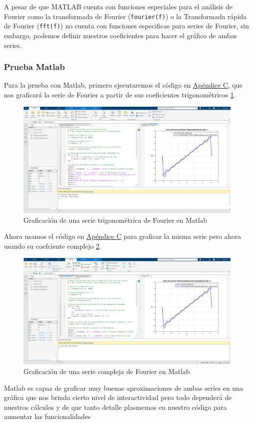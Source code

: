 A pesar de que MATLAB cuenta con funciones especiales para el análisis de Fourier como la transformada de Fourier (\texttt{fourier(f)}) o la Transformada rápida de Fourier (\texttt{fft(f)}) no cuenta con funciones especificas para series de Fourier, sin embargo, podemos definir nuestros coeficientes para hacer el gráfico de ambas series.

\subsubsection{Prueba Matlab}
Para la prueba con Matlab, primero ejecutaremos el código en \hyperref[app3:trig-code-matlab]{Apéndice C}, que nos graficará la serie de Fourier a partir de sus coeficientes trigonométricos \ref{fig:matlab-trig-series}. 
\begin{figure}[H]
	\centering
	\includegraphics[width=1\textwidth]{img/chapter02/matlab-fourier-trig.png}
	\caption{Graficación de una serie trigonométrica de Fourier en Matlab}
	\label{fig:matlab-trig-series}  %
\end{figure}
Ahora usamos el código en \hyperref[app3:complex-code-matlab]{Apéndice C} para graficar la misma serie pero ahora usando su coefciente complejo \ref{fig:matlab-complex-series}.
\begin{figure}[H]
	\centering
	\includegraphics[width=1\textwidth]{img/chapter02/matlab-complex-series.png}
	\caption{Graficación de una serie compleja de Fourier en Matlab}
	\label{fig:matlab-complex-series}  %
\end{figure}
Matlab es capaz de graficar muy buenas aproximaciones de ambas series en una gráfica que nos brinda cierto nivel de interactividad pero todo dependerá de nuestros cálculos y de que tanto detalle plasmemos en nuestro código para aumentar las funcionalidades


